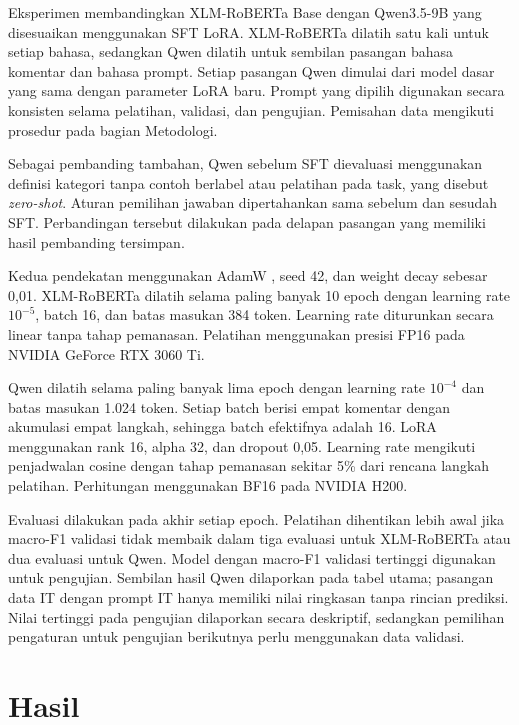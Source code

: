 \documentclass[11pt]{article}
\begin{document}
Eksperimen membandingkan XLM-RoBERTa Base dengan Qwen3.5-9B yang disesuaikan menggunakan SFT LoRA. XLM-RoBERTa dilatih satu kali untuk setiap bahasa, sedangkan Qwen dilatih untuk sembilan pasangan bahasa komentar dan bahasa prompt. Setiap pasangan Qwen dimulai dari model dasar yang sama dengan parameter LoRA baru. Prompt yang dipilih digunakan secara konsisten selama pelatihan, validasi, dan pengujian. Pemisahan data mengikuti prosedur pada bagian Metodologi.

Sebagai pembanding tambahan, Qwen sebelum SFT dievaluasi menggunakan definisi kategori tanpa contoh berlabel atau pelatihan pada task, yang disebut \textit{zero-shot}. Aturan pemilihan jawaban dipertahankan sama sebelum dan sesudah SFT. Perbandingan tersebut dilakukan pada delapan pasangan yang memiliki hasil pembanding tersimpan.

Kedua pendekatan menggunakan AdamW \citep{loshchilov-hutter-2019-decoupled}, seed 42, dan weight decay sebesar 0,01. XLM-RoBERTa dilatih selama paling banyak 10 epoch dengan learning rate $10^{-5}$, batch 16, dan batas masukan 384 token. Learning rate diturunkan secara linear tanpa tahap pemanasan. Pelatihan menggunakan presisi FP16 pada NVIDIA GeForce RTX 3060 Ti.

Qwen dilatih selama paling banyak lima epoch dengan learning rate $10^{-4}$ dan batas masukan 1.024 token. Setiap batch berisi empat komentar dengan akumulasi empat langkah, sehingga batch efektifnya adalah 16. LoRA menggunakan rank 16, alpha 32, dan dropout 0,05. Learning rate mengikuti penjadwalan cosine dengan tahap pemanasan sekitar 5\% dari rencana langkah pelatihan. Perhitungan menggunakan BF16 pada NVIDIA H200.

Evaluasi dilakukan pada akhir setiap epoch. Pelatihan dihentikan lebih awal jika macro-F1 validasi tidak membaik dalam tiga evaluasi untuk XLM-RoBERTa atau dua evaluasi untuk Qwen. Model dengan macro-F1 validasi tertinggi digunakan untuk pengujian. Sembilan hasil Qwen dilaporkan pada tabel utama; pasangan data IT dengan prompt IT hanya memiliki nilai ringkasan tanpa rincian prediksi. Nilai tertinggi pada pengujian dilaporkan secara deskriptif, sedangkan pemilihan pengaturan untuk pengujian berikutnya perlu menggunakan data validasi.

\section{Hasil}
\end{document}
